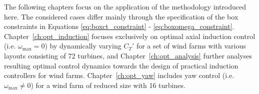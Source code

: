 The following chapters focus on the application of the methodology introduced here. The considered cases differ mainly through the specification of the box constraints in Equations \eqref{eq:boxct_constraint} - \eqref{eq:boxomega_constraint}. Chapter~\ref{ch:opt_induction} focuses exclusively on optimal axial induction control (i.e. $\omega_{\text{max}} = 0$) by dynamically varying $C_T'$ for a set of wind farms with various layouts consisting of 72 turbines, and Chapter~\ref{ch:opt_analysis} further analyses resulting optimal control dynamics towards the design of practical induction controllers for wind farms. Chapter~\ref{ch:opt_yaw} includes yaw control (i.e. $\omega_{\text{max}} \neq 0$) for a wind farm of reduced size with 16 turbines. 


\cleardoublepage
